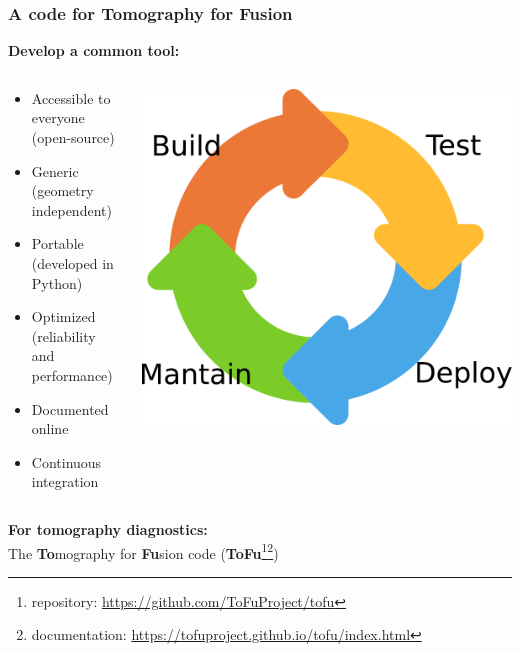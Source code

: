 \documentclass[10pt]{beamer}
\begin{document}
\begin{frame}
\frametitle{A code for Tomography for Fusion}
\textbf{Develop a common tool:}
\begin{columns}
\begin{column}{0.65\textwidth}
	\begin{itemize}
	\item Accessible to everyone (open-source)
	\item Generic (geometry independent)
	\item Portable (developed in Python)
	\item Optimized (reliability and performance)
	\item Documented online
	\item Continuous integration
	\end{itemize}
\end{column}
\begin{column}{0.35\textwidth}
\vspace{-1cm}
\begin{center}
    	\includegraphics[width=0.8\linewidth]{figures/ci.pdf}
\end{center}
\end{column}
\end{columns}

\begin{block}{}
	\begin{center}
	\textbf{For tomography diagnostics:\\ } The \textcolor{SchoolColor}{\textbf{To}mography for \textbf{Fu}sion} code (\textcolor{SchoolColor}{\textbf{ToFu}\footnote{repository: \url{https://github.com/ToFuProject/tofu}}\footnote{documentation: \url{https://tofuproject.github.io/tofu/index.html} }})
	\end{center}
\vspace{-5mm} 
\end{block}
	
\end{frame}
\end{document}
